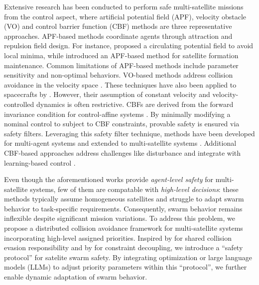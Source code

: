 \documentclass{ifacconf}
\begin{document}
\par Extensive research has been conducted to perform safe multi-satellite missions from the control aspect, where artificial potential field (APF), velocity obstacle (VO) and control barrier function (CBF) methods are three representative approaches.
APF-based methods coordinate agents through attraction and repulsion field design. 
For instance, \cite{Hwang2022APF} proposed a circulating potential field to avoid local minima, while \cite{Guan2024APF} introduced an APF-based method for satellite formation maintenance.
Common limitations of APF-based methods include parameter sensitivity and non-optimal behaviors. 
VO-based methods address collision avoidance in the velocity space \cite[]{Douthwaite2019VO}. 
These techniques have also been applied to spacecrafts by \cite{Li2025ELVO}.
However, their assumption of constant velocity and velocity-controlled dynamics is often restrictive.
CBFs are derived from the forward invariance condition for control-affine systems \cite[]{Ames2019CBFreview}. 
By minimally modifying a nominal control to subject to CBF constraints, provable safety is ensured via safety filters.
Leveraging this safety filter technique, methods have been developed for multi-agent systems \cite[]{Borrmann2015CBFswarm} and extended to multi-satellite systems \cite[]{Hibbard2022CBFspacecraft}. 
Additional CBF-based approaches address challenges like disturbance  \cite[]{Cheng2020CBFDisturbance} and integrate with learning-based control \cite[]{Liu2024RLFlocking}.

\par Even though the aforementioned works provide \textit{agent-level safety} for multi-satellite systems, few of them are compatable with \textit{high-level decisions}:
these methods typically assume homogeneous satellites and struggle to adapt swarm behavior to task-specific requirements.
Consequently, swarm behavior remains inflexible despite significant mission variations. 
To address this problem, we propose a distributed collision avoidance framework for multi-satellite systems incorporating high-level assigned priorities.
Inspired by \cite{Berg2011ORCA} for shared collision evasion responsibility and by \cite{Chen2021Backup} for constraint decoupling, we introduce a ``safety protocol'' for satelite swarm safety. 
By integrating optimization or large language models (LLMs) to adjust priority parameters within this ``protocol'', we further enable dynamic adaptation of swarm behavior.
\end{document}
